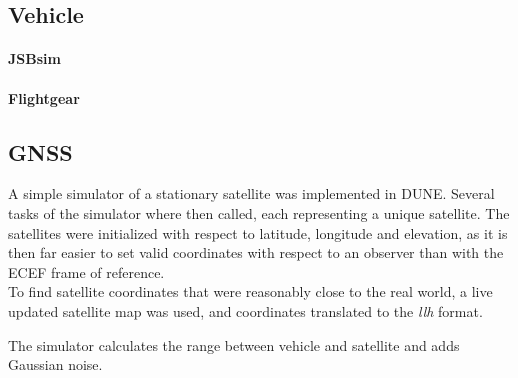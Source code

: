 \subsection{Vehicle}
    \paragraph{JSBsim}
    
    \paragraph{Flightgear}
    
\subsection{GNSS}
    
    A simple simulator of a stationary satellite was implemented in DUNE. Several tasks of the simulator where then called, each representing a unique satellite. The satellites were initialized with respect to latitude, longitude and elevation, as it is then far easier to set valid coordinates with respect to an observer than with the ECEF frame of reference.\\

    To find satellite coordinates that were reasonably close to the real world, a live updated satellite map was used, and coordinates translated to the \textit{llh} format.

    The simulator calculates the range between vehicle and satellite and adds Gaussian noise.\\ 

